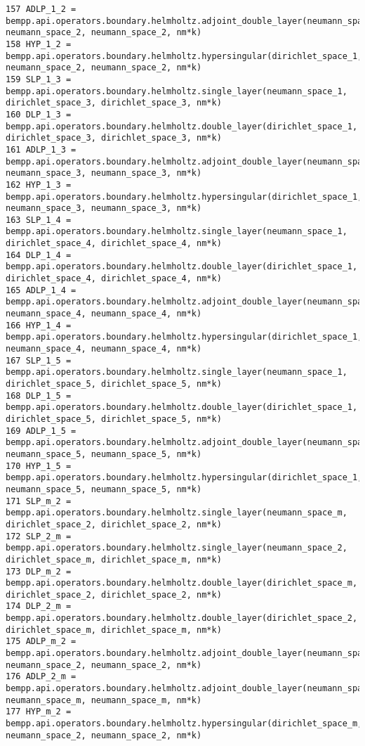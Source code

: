 \documentclass[12pt,letterpaper]{report}
\numberwithin{equation}{section}
\begin{document}
\begin{lstlisting}
157 ADLP_1_2 = bempp.api.operators.boundary.helmholtz.adjoint_double_layer(neumann_space_1, neumann_space_2, neumann_space_2, nm*k)
158 HYP_1_2 = bempp.api.operators.boundary.helmholtz.hypersingular(dirichlet_space_1, neumann_space_2, neumann_space_2, nm*k)
159 SLP_1_3 = bempp.api.operators.boundary.helmholtz.single_layer(neumann_space_1, dirichlet_space_3, dirichlet_space_3, nm*k)
160 DLP_1_3 = bempp.api.operators.boundary.helmholtz.double_layer(dirichlet_space_1, dirichlet_space_3, dirichlet_space_3, nm*k)
161 ADLP_1_3 = bempp.api.operators.boundary.helmholtz.adjoint_double_layer(neumann_space_1, neumann_space_3, neumann_space_3, nm*k)
162 HYP_1_3 = bempp.api.operators.boundary.helmholtz.hypersingular(dirichlet_space_1, neumann_space_3, neumann_space_3, nm*k)
163 SLP_1_4 = bempp.api.operators.boundary.helmholtz.single_layer(neumann_space_1, dirichlet_space_4, dirichlet_space_4, nm*k)
164 DLP_1_4 = bempp.api.operators.boundary.helmholtz.double_layer(dirichlet_space_1, dirichlet_space_4, dirichlet_space_4, nm*k)
165 ADLP_1_4 = bempp.api.operators.boundary.helmholtz.adjoint_double_layer(neumann_space_1, neumann_space_4, neumann_space_4, nm*k)
166 HYP_1_4 = bempp.api.operators.boundary.helmholtz.hypersingular(dirichlet_space_1, neumann_space_4, neumann_space_4, nm*k)
167 SLP_1_5 = bempp.api.operators.boundary.helmholtz.single_layer(neumann_space_1, dirichlet_space_5, dirichlet_space_5, nm*k)
168 DLP_1_5 = bempp.api.operators.boundary.helmholtz.double_layer(dirichlet_space_1, dirichlet_space_5, dirichlet_space_5, nm*k)
169 ADLP_1_5 = bempp.api.operators.boundary.helmholtz.adjoint_double_layer(neumann_space_1, neumann_space_5, neumann_space_5, nm*k)
170 HYP_1_5 = bempp.api.operators.boundary.helmholtz.hypersingular(dirichlet_space_1, neumann_space_5, neumann_space_5, nm*k)
171 SLP_m_2 = bempp.api.operators.boundary.helmholtz.single_layer(neumann_space_m, dirichlet_space_2, dirichlet_space_2, nm*k)
172 SLP_2_m = bempp.api.operators.boundary.helmholtz.single_layer(neumann_space_2, dirichlet_space_m, dirichlet_space_m, nm*k)
173 DLP_m_2 = bempp.api.operators.boundary.helmholtz.double_layer(dirichlet_space_m, dirichlet_space_2, dirichlet_space_2, nm*k)
174 DLP_2_m = bempp.api.operators.boundary.helmholtz.double_layer(dirichlet_space_2, dirichlet_space_m, dirichlet_space_m, nm*k)
175 ADLP_m_2 = bempp.api.operators.boundary.helmholtz.adjoint_double_layer(neumann_space_m, neumann_space_2, neumann_space_2, nm*k)
176 ADLP_2_m = bempp.api.operators.boundary.helmholtz.adjoint_double_layer(neumann_space_2, neumann_space_m, neumann_space_m, nm*k)
177 HYP_m_2 = bempp.api.operators.boundary.helmholtz.hypersingular(dirichlet_space_m, neumann_space_2, neumann_space_2, nm*k)

\end{lstlisting}
\end{document}
